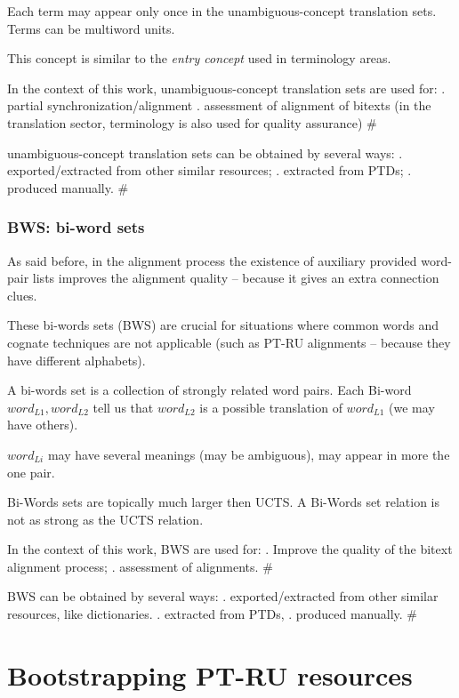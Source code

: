 \documentclass[a4paper,russian,UKenglish]{oasics}
\def\UC{unambiguous-concept}
\def\UCTS{\UC{} translation sets}
\def\UCTSS{{\sc UCTS}}
\def\PTDS{{\sc PTDs}}
\def\BWS{bi-word sets}
\def\BWSS{{\sc BWS}}
\begin{document}
Each term may appear only once in the \UCTS.
Terms can be multiword units.

This concept is similar to the \emph{entry concept} used in terminology areas.

In the context of this work, \UCTS{} are used for:
  . partial synchronization/alignment
  . assessment of alignment of bitexts (in the translation sector, terminology
is also used for quality assurance)
#

\UCTS{} can be obtained by several ways:
  . exported/extracted from other similar resources;
  . extracted from \PTDS;
  . produced manually.
  #


\subsubsection*{BWS: \BWS}

As said before, in the alignment process the existence of
auxiliary provided word-pair lists improves the alignment quality -- because
it gives an extra connection clues.

These bi-words sets (\BWSS) are crucial for situations where common words and cognate 
techniques are not applicable (such as PT-RU alignments -- because they have different
alphabets).

A bi-words set is a collection of strongly related word pairs.
Each Bi-word $word_{L1},word_{L2}$ tell us that $word_{L2}$ is a possible translation
of $word_{L1}$ (we may have others).

$word_{Li}$ may have several meanings (may be ambiguous), may appear in more the one
pair.

Bi-Words sets are topically much larger then \UCTSS. 
A Bi-Words set relation is not as strong as the \UCTSS{} relation. 

In the context of this work, \BWSS{} are used for:
  . Improve the quality of the bitext alignment process;
  . assessment of alignments.
#

\BWSS{} can be obtained by several ways:
  . exported/extracted from other similar resources, like dictionaries.
  . extracted from \PTDS,
  . produced manually.
  #


\section{Bootstrapping PT-RU resources}\label{sec:boot_ptru}
\end{document}
